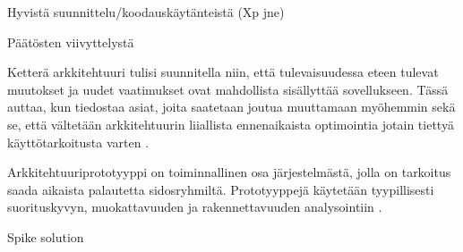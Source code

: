 Hyvistä suunnittelu/koodauskäytänteistä (Xp jne)

Päätösten viivyttelystä

Ketterä arkkitehtuuri tulisi suunnitella niin, että tulevaisuudessa eteen tulevat muutokset ja uudet vaatimukset ovat mahdollista sisällyttää sovellukseen. Tässä auttaa, kun tiedostaa asiat, joita saatetaan joutua muuttamaan myöhemmin sekä se, että vältetään arkkitehtuurin liiallista ennenaikaista optimointia jotain tiettyä käyttötarkoitusta varten 
\citep{waterman_agility_2018_a}.  

Arkkitehtuuriprototyyppi on toiminnallinen osa järjestelmästä, jolla on tarkoitus saada aikaista palautetta sidosryhmiltä. Prototyyppejä käytetään tyypillisesti suorituskyvyn, muokattavuuden ja rakennettavuuden analysointiin \citep{babar_agile_2013}. 

Spike solution